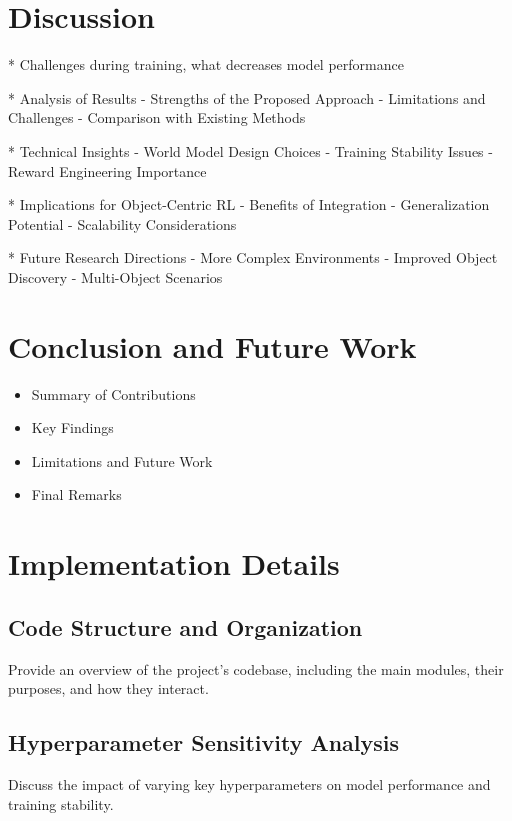 \documentclass[
	english,
	ruledheaders=section,
	class=report,
	thesis={type=master},
	accentcolor=9c,
	custommargins=true,
	marginpar=false,
	parskip=half-,
	fontsize=11pt,
]{tudapub}
\begin{document}
\chapter{Discussion}
\label{chap:discussion}
* Challenges during training, what decreases model performance

* Analysis of Results
	- Strengths of the Proposed Approach
	- Limitations and Challenges
	- Comparison with Existing Methods

* Technical Insights
	- World Model Design Choices
	- Training Stability Issues
	- Reward Engineering Importance

* Implications for Object-Centric RL
	- Benefits of Integration
	- Generalization Potential
	- Scalability Considerations

* Future Research Directions
	- More Complex Environments
	- Improved Object Discovery
	- Multi-Object Scenarios

\chapter{Conclusion and Future Work}
\label{chap:conclusion}

\begin{itemize}
	\item Summary of Contributions
	\item Key Findings
	\item Limitations and Future Work
	\item Final Remarks
\end{itemize}

\printbibliography[title={References}]

\appendix

\chapter{Implementation Details}
\label{app:implementation}

\section{Code Structure and Organization}
\label{app:code_structure}
Provide an overview of the project's codebase, including the main modules, their purposes, and how they interact.

\section{Hyperparameter Sensitivity Analysis}
\label{app:hyperparameter_analysis}
Discuss the impact of varying key hyperparameters on model performance and training stability.
\end{document}
